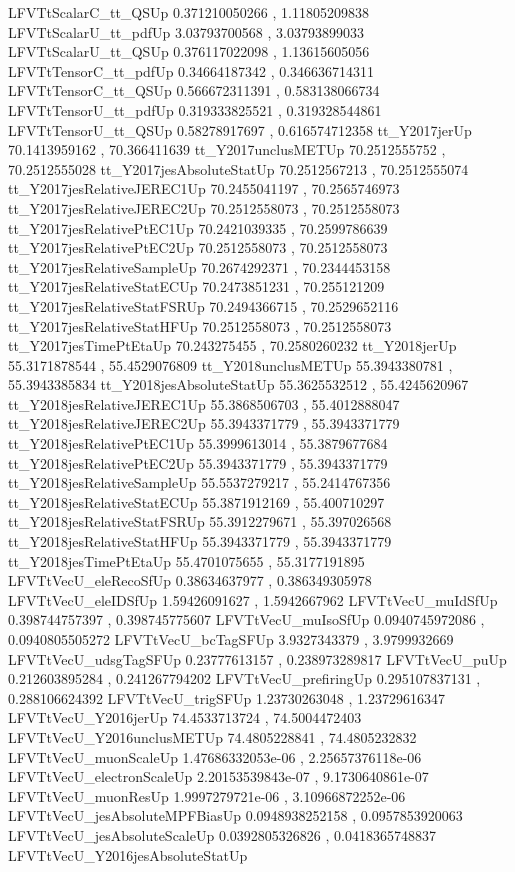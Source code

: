 LFVTtScalarC_tt_QSUp
0.371210050266 , 1.11805209838
LFVTtScalarU_tt_pdfUp
3.03793700568 , 3.03793899033
LFVTtScalarU_tt_QSUp
0.376117022098 , 1.13615605056
LFVTtTensorC_tt_pdfUp
0.34664187342 , 0.346636714311
LFVTtTensorC_tt_QSUp
0.566672311391 , 0.583138066734
LFVTtTensorU_tt_pdfUp
0.319333825521 , 0.319328544861
LFVTtTensorU_tt_QSUp
0.58278917697 , 0.616574712358
tt_Y2017jerUp
70.1413959162 , 70.366411639
tt_Y2017unclusMETUp
70.2512555752 , 70.2512555028
tt_Y2017jesAbsoluteStatUp
70.2512567213 , 70.2512555074
tt_Y2017jesRelativeJEREC1Up
70.2455041197 , 70.2565746973
tt_Y2017jesRelativeJEREC2Up
70.2512558073 , 70.2512558073
tt_Y2017jesRelativePtEC1Up
70.2421039335 , 70.2599786639
tt_Y2017jesRelativePtEC2Up
70.2512558073 , 70.2512558073
tt_Y2017jesRelativeSampleUp
70.2674292371 , 70.2344453158
tt_Y2017jesRelativeStatECUp
70.2473851231 , 70.255121209
tt_Y2017jesRelativeStatFSRUp
70.2494366715 , 70.2529652116
tt_Y2017jesRelativeStatHFUp
70.2512558073 , 70.2512558073
tt_Y2017jesTimePtEtaUp
70.243275455 , 70.2580260232
tt_Y2018jerUp
55.3171878544 , 55.4529076809
tt_Y2018unclusMETUp
55.3943380781 , 55.3943385834
tt_Y2018jesAbsoluteStatUp
55.3625532512 , 55.4245620967
tt_Y2018jesRelativeJEREC1Up
55.3868506703 , 55.4012888047
tt_Y2018jesRelativeJEREC2Up
55.3943371779 , 55.3943371779
tt_Y2018jesRelativePtEC1Up
55.3999613014 , 55.3879677684
tt_Y2018jesRelativePtEC2Up
55.3943371779 , 55.3943371779
tt_Y2018jesRelativeSampleUp
55.5537279217 , 55.2414767356
tt_Y2018jesRelativeStatECUp
55.3871912169 , 55.400710297
tt_Y2018jesRelativeStatFSRUp
55.3912279671 , 55.397026568
tt_Y2018jesRelativeStatHFUp
55.3943371779 , 55.3943371779
tt_Y2018jesTimePtEtaUp
55.4701075655 , 55.3177191895
LFVTtVecU_eleRecoSfUp
0.38634637977 , 0.386349305978
LFVTtVecU_eleIDSfUp
1.59426091627 , 1.5942667962
LFVTtVecU_muIdSfUp
0.398744757397 , 0.398745775607
LFVTtVecU_muIsoSfUp
0.0940745972086 , 0.0940805505272
LFVTtVecU_bcTagSFUp
3.9327343379 , 3.9799932669
LFVTtVecU_udsgTagSFUp
0.23777613157 , 0.238973289817
LFVTtVecU_puUp
0.212603895284 , 0.241267794202
LFVTtVecU_prefiringUp
0.295107837131 , 0.288106624392
LFVTtVecU_trigSFUp
1.23730263048 , 1.23729616347
LFVTtVecU_Y2016jerUp
74.4533713724 , 74.5004472403
LFVTtVecU_Y2016unclusMETUp
74.4805228841 , 74.4805232832
LFVTtVecU_muonScaleUp
1.47686332053e-06 , 2.25657376118e-06
LFVTtVecU_electronScaleUp
2.20153539843e-07 , 9.1730640861e-07
LFVTtVecU_muonResUp
1.9997279721e-06 , 3.10966872252e-06
LFVTtVecU_jesAbsoluteMPFBiasUp
0.0948938252158 , 0.0957853920063
LFVTtVecU_jesAbsoluteScaleUp
0.0392805326826 , 0.0418365748837
LFVTtVecU_Y2016jesAbsoluteStatUp
